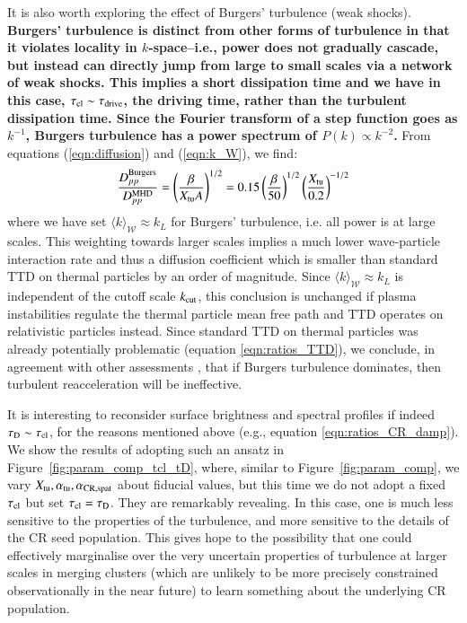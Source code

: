 \documentclass[fleqn,usenatbib,useAMS]{mnras}
\newcommand\C[1]{{\bf #1}}
\begin{document}
It is also worth exploring the effect of Burgers' turbulence (weak shocks). \C{Burgers' turbulence is distinct from other forms of turbulence in that it violates locality in $k$-space--i.e., power does not gradually cascade, but instead can directly jump from large to small scales via a network of weak shocks. This implies a short dissipation time and we have in this case, $\tau_{\rm cl} \sim \tau_{\rm drive}$, the driving time, rather than the turbulent dissipation time. Since the Fourier transform of a step function goes as $k^{-1}$, Burgers turbulence has a power spectrum of $P(k) \propto k^{-2}$.} From equations (\ref{eqn:diffusion}) and (\ref{eqn:k_W}), we find: 
\begin{equation}
\frac{D_{pp}^{\rm Burgers}}{D_{pp}^{\rm MHD}} = \left( \frac{\beta}{X_{\rm tu} A} \right)^{1/2} = 0.15 \left( \frac{\beta}{50} \right)^{1/2} \left( \frac{X_{\rm tu}}{0.2} \right)^{-1/2} 
\end{equation}
where we have set $\langle k \rangle_{\mathcal{W}} \approx k_L$ for Burgers' turbulence, i.e. all power is at large scales. This weighting towards larger scales implies a much lower wave-particle interaction rate and thus a diffusion coefficient which is smaller than standard TTD on thermal particles by an order of magnitude. Since $\langle k \rangle_{\mathcal{W}} \approx k_L$ is independent of the cutoff scale $k_{\rm cut}$, this conclusion is unchanged if plasma instabilities regulate the thermal particle mean free path and TTD operates on relativistic particles instead. Since standard TTD on thermal particles was already potentially problematic (equation \ref{eqn:ratios_TTD}), we conclude, in agreement with other assessments \citep{miniati15,brunetti16_review}, that if Burgers turbulence dominates, then turbulent reacceleration will be ineffective.

It is interesting to reconsider surface brightness and spectral profiles if indeed $\tau_{\rm D} \sim \tau_{\rm cl}$, for the reasons mentioned above (e.g., equation \ref{eqn:ratios_CR_damp}). We show the results of adopting such an ansatz in Figure~\ref{fig:param_comp_tcl_tD}, where, similar to Figure~\ref{fig:param_comp}, we vary $X_{\rm tu}, \alpha_{\rm tu}, \alpha_{\rm CR, spat}$ about fiducial values, but this time we do not adopt a fixed $\tau_{\rm cl}$ but set $\tau_{\rm cl}=\tau_{\rm D}$.  They are remarkably revealing. In this case, one is much less sensitive to the properties of the turbulence, and more sensitive to the details of the CR seed population. This gives hope to the possibility that one could effectively marginalise over the very uncertain properties of turbulence at larger scales in merging clusters (which are unlikely to be more precisely constrained observationally in the near future) to learn something about the underlying CR population. 
\end{document}
